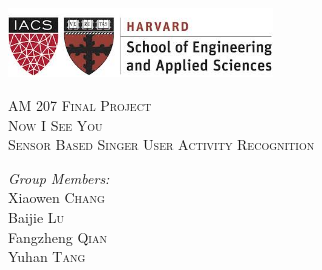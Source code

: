 \documentclass[10pt,letter]{article}
\numberwithin{equation}{section} %
\numberwithin{figure}{section} %
\numberwithin{table}{section} %
\begin{document}
\begin{titlepage}

\newcommand{\HRule}{\rule{\linewidth}{0.5mm}} %

\includegraphics[width=7cm]{logo.png}\\[2cm] 
\center %

\textsc{\Huge AM 207 Final Project}\\[1.5cm] %
\textsc{\LARGE Now I See You}\\[0.5cm] %
\textsc{\Large Sensor Based Singer User Activity Recognition}\\[3cm] %
 

\begin{minipage}{0.4\textwidth}
\center \large
\emph{Group Members:}\\[0.4cm]
Xiaowen \textsc{Chang} \\
Baijie \textsc{Lu}\\ 
Fangzheng \textsc{Qian} \\
Yuhan \textsc{Tang} 
\end{minipage}
 

\vfill %

\end{titlepage}
\end{document}
